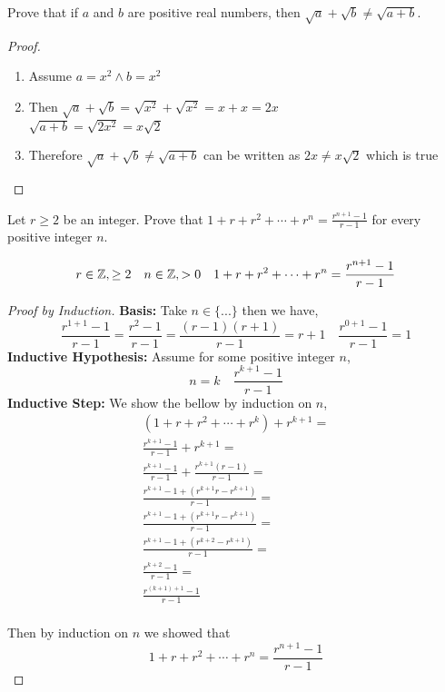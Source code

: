 \documentclass{homework}
\begin{document}
\question Prove that if $a$ and $b$ are positive real numbers, then $\sqrt{a} + \sqrt{b} \neq \sqrt{a+b}$.
\begin{sol}
	\begin{proof}
		\begin{enumerate}
			\item Assume $a = x^2 \land b = x^2$
			\item Then $\sqrt{a} + \sqrt{b} = \sqrt{x^2} + \sqrt{x^2} = x + x = 2x$ \\
			$\sqrt{a+b} = \sqrt{2x^2} = x\sqrt{2}$
			\item Therefore $\sqrt{a} + \sqrt{b} \neq \sqrt{a+b}$ can be written as $2x \neq x\sqrt{2}$ which is true
		\end{enumerate}
	\end{proof}
\end{sol}

\question Let $r \geq 2$ be an integer. Prove that $1 + r + r^{2} + \cdots + r^{n} = \frac{r^{n+1}-1}{r-1}$ for every positive integer $n$.

\begin{sol}
\[
	r \in \mathbb{Z}, \geq 2 \quad
	n \in \mathbb{Z}, > 0 \quad
	1 + r + r^2 + \cdots + r^n = \frac{r^{n+1} - 1}{r - 1}
\]
\begin{proof}[Proof by Induction] %

    \textbf{Basis:} Take $n\in\{...\}$ then we have,
    \[
		\frac{r^{1+1}-1}{r-1} = \frac{r^2 - 1}{r - 1} = \frac{(r-1)(r+1)}{r-1} = r+1 \quad
		\frac{r^{0+1}-1}{r-1} = 1
    \]
    \textbf{Inductive Hypothesis:} Assume for some positive integer $n$,
    \[
		n = k \quad \frac{r^{k+1}-1}{r-1}
    \]
    \textbf{Inductive Step:} We show the bellow by induction on $n$,
    \begin{align*}
		(1+r+r^2+\cdots+r^k)+r^{k+1} = \\
		\frac{r^{k+1}-1}{r-1} + r^{k+1} = \\ 
		\frac{r^{k+1}-1}{r-1} + \frac{r^{k+1}(r-1)}{r-1} = \\
		\frac{r^{k+1}-1+(r^{k+1}r - r^{k+1})}{r-1} = \\
		\frac{r^{k+1}-1+(r^{k+1}r - r^{k+1})}{r-1} = \\
		\frac{r^{k+1}-1+(r^{k+2} - r^{k+1})}{r-1} = \\
		\frac{r^{k+2}-1}{r-1} =\\
		\frac{r^{(k+1)+1}-1}{r-1} \\
	\end{align*}
		

    Then by induction on $n$ we showed that %
	\[
		1 + r + r^2 + \cdots + r^n = \frac{r^{n+1} - 1}{r - 1}
	\]

\end{proof}
\end{sol}
\end{document}
